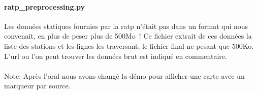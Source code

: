 \documentclass[a4paper, 8pt]{article}
\begin{document}
\paragraph{ratp\_preprocessing.py} Les données statiques fournies par la ratp
n'était pas dans un format qui nous convenait, en plus de peser plus de 500Mo~!
Ce fichier extrait de ces données la liste des stations et les lignes les
traversant, le fichier final ne pesant que 500Ko.
L'url ou l'on peut trouver les données brut est indiqué en
commentaire.\\\\


\small{Note: Après l'oral nous avons changé la démo pour afficher une carte avec un marqueur par
source.}
\end{document}
